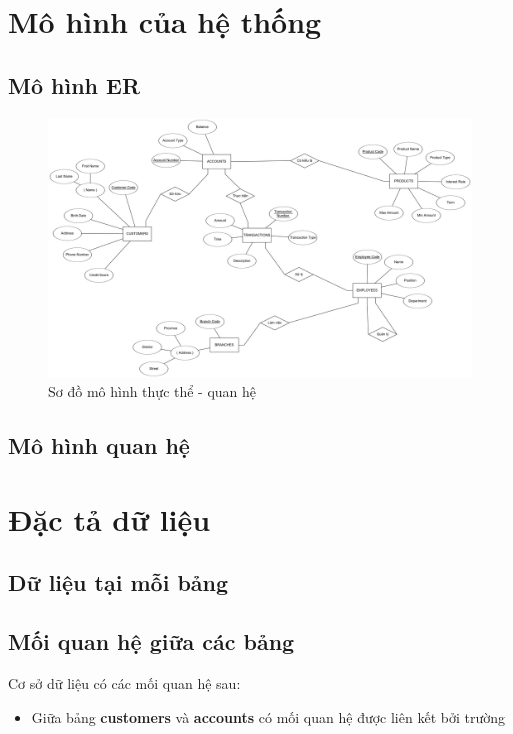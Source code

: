 \documentclass[a4paper, 12pt]{report}
\begin{document}
\chapter{Mô hình của hệ thống}

\section{Mô hình ER}

\begin{figure}[H]
    \centering
    \includegraphics[width=1\textwidth]{ER-Diagram.png}
    \caption{Sơ đồ mô hình thực thể - quan hệ}
    \label{fig:br-wm-2020}
\end{figure}

\section{Mô hình quan hệ}


\chapter{Đặc tả dữ liệu}

\section{Dữ liệu tại mỗi bảng}



\section{Mối quan hệ giữa các bảng}

Cơ sở dữ liệu có các mối quan hệ sau:

\begin{itemize}[leftmargin=2cm]
    \item Giữa bảng \textbf{customers} và \textbf{accounts} có mối quan hệ được liên kết bởi trường
\end{itemize}
\end{document}
